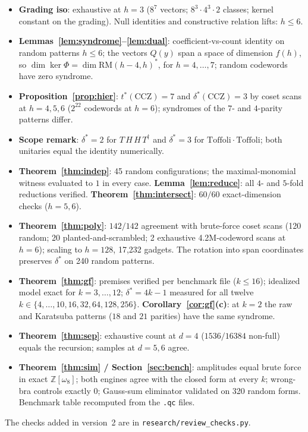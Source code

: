 \documentclass[11pt]{article}
\theoremstyle{definition}
\theoremstyle{remark}
\newcommand{\Z}{\mathbb{Z}}
\newcommand{\RM}{\mathrm{RM}}
\newcommand{\ds}{\delta^{*}}
\newcommand{\ts}{t^{*}}
\newcommand{\code}[1]{\texttt{#1}}
\begin{document}
\begin{itemize}[leftmargin=*]
\item \textbf{Grading iso}: exhaustive at $h=3$ ($8^7$ vectors; $8^3\cdot4^3\cdot2$ classes; kernel constant on the
grading). Null identities and constructive relation lifts: $h\le6$.
\item \textbf{Lemmas~\ref{lem:syndrome}--\ref{lem:dual}}: coefficient-vs-count identity on random patterns $h\le6$; the vectors $Q(y)$
span a space of dimension $f(h)$, so $\dim\ker\Phi=\dim\RM(h-4,h)^{*}$, for $h=4,\dots,7$; random codewords have zero syndrome.
\item \textbf{Proposition~\ref{prop:hier}}: $\ts(\mathrm{CCZ})=7$ and $\ds(\mathrm{CCZ})=3$ by coset scans at $h=4,5,6$ ($2^{22}$ codewords at $h=6$);
syndromes of the $7$- and $4$-parity patterns differ.
\item \textbf{Scope remark}: $\ds=2$ for $T\,H\,H\,T^{\dagger}$ and $\ds=3$ for $\mathrm{Toffoli}\cdot\mathrm{Toffoli}$; both unitaries equal the identity numerically.
\item \textbf{Theorem~\ref{thm:indep}}: 45 random configurations; the maximal-monomial witness evaluated to $1$ in
every case. \textbf{Lemma~\ref{lem:reduce}}: all $4$- and $5$-fold reductions verified. \textbf{Theorem~\ref{thm:intersect}}: $60/60$ exact-dimension
checks ($h=5,6$).
\item \textbf{Theorem~\ref{thm:poly}}: $142/142$ agreement with brute-force coset scans (120 random; 20 planted-and-scrambled;
2 exhaustive 4.2M-codeword scans at $h=6$); scaling to $h=128$, 17{,}232 gadgets. The rotation into span coordinates
preserves $\ds$ on 240 random patterns.
\item \textbf{Theorem~\ref{thm:gf}}: premises verified per benchmark file ($k\le16$); idealized model exact for
$k=3,\dots,12$; $\ds=4k-1$ measured for all twelve $k\in\{4,\dots,10,16,32,64,128,256\}$. \textbf{Corollary~\ref{cor:gf}(c)}: at $k=2$ the raw
and Karatsuba patterns ($18$ and $21$ parities) have the same syndrome.
\item \textbf{Theorem~\ref{thm:sep}}: exhaustive count at $d=4$ ($1536/16384$ non-full) equals the recursion; samples at $d=5,6$ agree.
\item \textbf{Theorem~\ref{thm:sim} / Section~\ref{sec:bench}}: amplitudes equal brute force in exact $\Z[\omega_8]$; both engines agree
with the closed form at every $k$; wrong-bra controls exactly $0$; Gauss-sum eliminator
validated on 320 random forms. Benchmark table recomputed from the \code{.qc} files.
\end{itemize}
The checks added in version~2 are in \code{research/review\_checks.py}.
\end{document}
